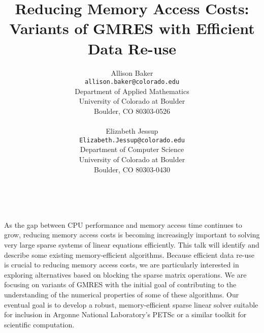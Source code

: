 \documentclass[11pt]{article}
\date{ ~ \hspace{-4mm}}
\title{Reducing Memory Access Costs:  Variants of GMRES with Efficient Data Re-use  }
\author{Allison Baker \\ {\tt allison.baker@colorado.edu} \\ Department of Applied Mathematics  \\  University of Colorado at Boulder  \\  Boulder, CO 80303-0526 \\ \\ Elizabeth Jessup \\ {\tt Elizabeth.Jessup@colorado.edu} \\ Department of Computer Science  \\  University of Colorado at Boulder  \\  Boulder, CO 80303-0430}
\begin{document}
\maketitle
\thispagestyle{empty}





 



As the gap between CPU performance and memory access time continues to
grow, reducing memory access costs is becoming increasingly important
to solving very large sparse systems of linear equations efficiently.
This talk will identify and describe some existing memory-efficient
algorithms.  Because efficient data re-use is crucial to reducing
memory access costs, we are particularly interested in exploring
alternatives based on blocking the sparse matrix operations.  We are
focusing on variants of GMRES with the initial goal of contributing to
the understanding of the numerical properties of some of these
algorithms.  Our eventual goal is to develop a robust,
memory-efficient sparse linear solver suitable for inclusion in
Argonne National Laboratory's PETSc or a similar toolkit for
scientific computation.
\end{document}
